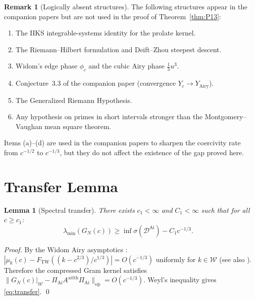 \documentclass[12pt,a4paper]{amsart}
\newtheorem{lemma}[theorem]{Lemma}
\theoremstyle{definition}
\newtheorem{remark}[theorem]{Remark}
\newcommand{\DAi}{\mathcal{D}^{\mathrm{Ai}}}
\newcommand{\PAi}{\Pi_{\mathrm{Ai}}}
\newcommand{\GN}{G_N(c)}
\newcommand{\norm}[1]{\|#1\|}
\newcommand{\spec}{\sigma}
\begin{document}
\begin{remark}[Logically absent structures]
The following structures appear in the companion papers
but are not used in the proof of Theorem~\ref{thm:P13}:
\begin{enumerate}[\rm (a)]
  \item The IIKS integrable-systems identity for the prolate kernel.
  \item The Riemann--Hilbert formulation and Deift--Zhou steepest descent.
  \item Widom's edge phase $\phi_c$ and the cubic Airy phase $\tfrac{1}{3}u^3$.
  \item Conjecture~3.3 of the companion paper (convergence $Y_c \to Y_{\mathrm{Airy}}$).
  \item The Generalized Riemann Hypothesis.
  \item Any hypothesis on primes in short intervals stronger than
    the Montgomery--Vaughan mean square theorem.
\end{enumerate}
Items (a)--(d) are used in the companion papers to sharpen the
coercivity rate from $c^{-1/2}$ to $c^{-1/3}$, but they do not affect
the existence of the gap proved here.
\end{remark}

\appendix

\section{Transfer Lemma}\label{app:transfer}

\begin{lemma}[Spectral transfer]\label{lem:transfer}
There exists $c_1 < \infty$ and $C_1 < \infty$ such that for all $c \ge c_1$:
\begin{equation}\label{eq:transfer}
  \lambda_{\min}(\GN)
  \ge \inf\spec(\DAi) - C_1 c^{-1/3}.
\end{equation}
\end{lemma}

\begin{proof}
By the Widom Airy asymptotics \cite{Widom1964}:
$|\mu_k(c) - F_{\mathrm{TW}}((k - c^{2/3})/c^{1/3})| = O(c^{-1/3})$
uniformly for $k \in \mathcal{W}$ (see also \cite{Bornemann2010}).
Therefore the compressed Gram kernel satisfies
$\norm{\GN|_{\mathcal{W}} - \PAi A^{\mathrm{arith}}\PAi}_{\mathrm{op}} = O(c^{-1/3})$.
Weyl's inequality gives \eqref{eq:transfer}. \qed
\end{proof}
\end{document}
